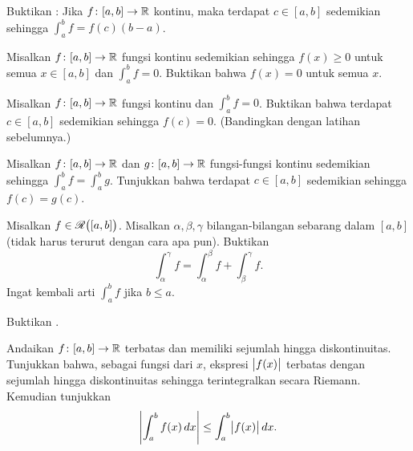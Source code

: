 \begin{exercise}
Buktikan \emph{}:
Jika $f \colon [a,b] \to {\mathbb{R}}$ kontinu, maka terdapat
$c \in [a,b]$ sedemikian sehingga $\int_a^b f = f(c)(b-a)$.
\end{exercise}

\begin{exercise}
Misalkan $f \colon [a,b] \to {\mathbb{R}}$ fungsi kontinu sedemikian sehingga $f(x) \geq 0$
untuk semua $x \in [a,b]$ dan $\int_a^b f = 0$.  Buktikan bahwa $f(x) = 0$
untuk semua $x$.
\end{exercise}

\begin{exercise}
Misalkan $f \colon [a,b] \to {\mathbb{R}}$ fungsi kontinu
dan $\int_a^b f = 0$.  Buktikan bahwa
terdapat $c \in [a,b]$ sedemikian sehingga $f(c) = 0$. (Bandingkan dengan
latihan sebelumnya.)
\end{exercise}

\begin{exercise}
Misalkan $f \colon [a,b] \to {\mathbb{R}}$ dan $g \colon [a,b] \to {\mathbb{R}}$
fungsi-fungsi kontinu sedemikian sehingga $\int_a^b f = \int_a^b g$.
Tunjukkan bahwa terdapat $c \in [a,b]$ sedemikian sehingga $f(c) = g(c)$.
\end{exercise}

\begin{exercise}
Misalkan $f \in {\mathscr{R}}\bigl([a,b]\bigr)$.  Misalkan $\alpha, \beta, \gamma$ bilangan-bilangan sebarang dalam
$[a,b]$ (tidak harus terurut dengan cara apa pun).  Buktikan 
\begin{equation*}
\int_\alpha^\gamma f =
\int_\alpha^\beta f +
\int_\beta^\gamma f .
\end{equation*}
Ingat kembali arti $\int_a^b f$ jika $b \leq a$.
\end{exercise}

\begin{exercise}
Buktikan .
\end{exercise}

\begin{exercise} \label{exercise:easyabsint}
Andaikan $f \colon [a,b] \to {\mathbb{R}}$ terbatas dan
memiliki sejumlah hingga diskontinuitas.
Tunjukkan bahwa, sebagai fungsi dari $x$, ekspresi $\bigl\lvert {f(x)} \bigr\rvert$ terbatas dengan sejumlah hingga
diskontinuitas sehingga terintegralkan secara Riemann.  Kemudian tunjukkan 
\begin{equation*}
\left\lvert {\int_a^b f(x)\,dx} \right\rvert \leq \int_a^b \bigl\lvert {f(x)} \bigr\rvert\,dx .
\end{equation*}
\end{exercise}

